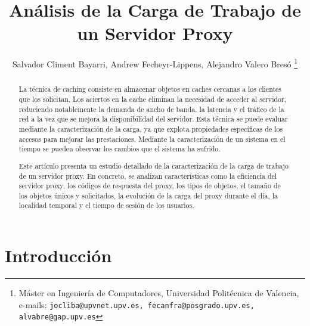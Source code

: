 \documentclass[twocolumn]{Jornadas}
\begin{document}
\title{Análisis de la Carga de Trabajo de un Servidor Proxy}

\author{%
     Salvador Climent Bayarri, %
     Andrew Fecheyr-Lippens, %
     Alejandro Valero Bresó%
	\thanks{Máster en Ingeniería de Computadores, Universidad Politécnica de Valencia, e-mails: {\tt jocliba@upvnet.upv.es, fecanfra@posgrado.upv.es, alvabre@gap.upv.es}}
     }

\maketitle
\markboth{}{}
\thispagestyle{empty} %

\begin{abstract}

La técnica de caching consiste en almacenar objetos en caches cercanas a los clientes que los solicitan. Los aciertos en la cache eliminan la necesidad de acceder al servidor, reduciendo notablemente la demanda de ancho de banda, la latencia y el tráfico de la red a la vez que se mejora la disponibilidad del servidor. Esta técnica se puede evaluar mediante la caracterización de la carga, ya que explota propiedades específicas de los accesos para mejorar las prestaciones. Mediante la caracterización de un sistema en el tiempo se pueden observar los cambios que el sistema ha sufrido.

Este artículo presenta un estudio detallado de la caracterización de la carga de trabajo de un servidor proxy. En concreto, se analizan características como la eficiencia del servidor proxy, los códigos de respuesta del proxy, los tipos de objetos, el tamaño de los objetos únicos y solicitados, la evolución de la carga del proxy durante el día, la localidad temporal y el tiempo de sesión de los usuarios.

\end{abstract}



\section{Introducción}
\label{intro}
\end{document}
